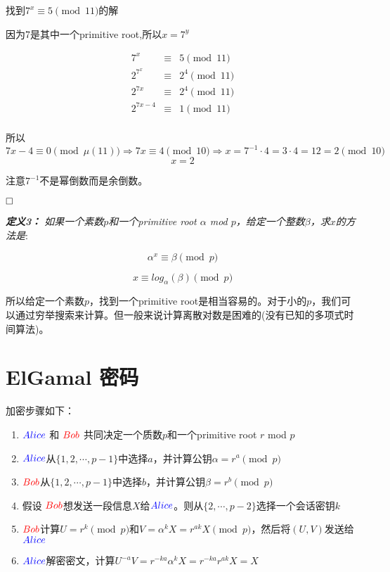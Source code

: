 \documentclass{article}
\begin{document}
找到$7^x \equiv 5 \pmod{11}$的解

因为7是其中一个primitive root,所以$x=7^y$

\begin{eqnarray}   
\label{eq}
7^x  &\equiv&5 \pmod{11} \nonumber \\
2^{7^x}  &\equiv&2^4 \pmod{11} \nonumber \\
2^{7x}  &\equiv&2^4 \pmod{11} \nonumber \\
2^{7x-4}  &\equiv&1 \pmod{11} \nonumber \\
\nonumber 
\end{eqnarray}

所以$7x-4 \equiv 0 \pmod{\mu(11)} \Rightarrow 7x\equiv 4 \pmod{10} \Rightarrow x = 7^{-1}\cdot 4 = 3 \cdot 4 = 12 = 2 \pmod{10}$    
$$x = 2$$

注意$ 7^{-1}$不是幂倒数而是余倒数。

$\hfill\square$ 

\textit{\textbf{定义3：} 如果一个素数$p$和一个primitive root $\alpha$ mod $p$，给定一个整数$\beta$，求$x$的方法是}:


$$\alpha^x  \equiv \beta \pmod{ p }$$

$$x  \equiv log_{\alpha}(\beta) \pmod{ p }$$

所以给定一个素数$p$，找到一个primitive root是相当容易的。对于小的$p$，我们可以通过穷举搜索来计算。但一般来说计算离散对数是困难的(没有已知的多项式时间算法)。

\section{ElGamal 密码}

加密步骤如下：

\begin{enumerate}
\item ${\color{blue}Alice}$ 和 ${\color{red}Bob}$ 共同决定一个质数$p$和一个primitive root $r$ mod $p$
\item  ${\color{blue}Alice}$从$\{1,2,\cdots,p-1\}$中选择$a$，并计算公钥$\alpha = r^{a} \pmod{p}$
\item  ${\color{red}Bob}$从$\{1,2,\cdots,p-1\}$中选择$b$，并计算公钥$\beta = r^{b} \pmod{p}$
\item 假设 ${\color{red}Bob}$想发送一段信息$X$给${\color{blue}Alice}$。则从$\{2,\cdots,p-2\}$选择一个会话密钥$k$
\item ${\color{red}Bob}$计算$U = r^k \pmod{p}$和$V = \alpha^kX = r^{ak}X \pmod{p}$，然后将$(U,V)$发送给${\color{blue}Alice}$
\item  ${\color{blue}Alice}$解密密文，计算$U^{-a}V = r^{-ka}\alpha^kX =  r^{-ka}r^{ak}X = X$
\end{enumerate}
\end{document}
